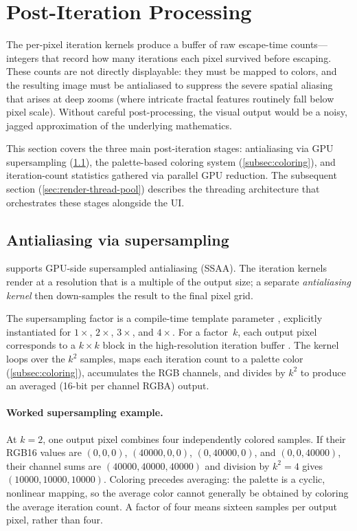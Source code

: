 \section{Post-Iteration Processing}
\label{sec:misc-details}

The per-pixel iteration kernels produce a buffer of raw escape-time
counts---integers that record how many iterations each pixel survived
before escaping.  These counts are not directly displayable: they must
be mapped to colors, and the resulting image must be antialiased to
suppress the severe spatial aliasing that arises at deep zooms (where
intricate fractal features routinely fall below pixel scale).  Without
careful post-processing, the visual output would be a noisy, jagged
approximation of the underlying mathematics.

This section covers the three main post-iteration stages:
antialiasing via GPU supersampling (\cref{subsec:antialiasing}), the
palette-based coloring system (\cref{subsec:coloring}), and
iteration-count statistics gathered via parallel GPU reduction.  The
subsequent section (\cref{sec:render-thread-pool}) describes the
threading architecture that orchestrates these stages alongside the UI.

\subsection{Antialiasing via supersampling}
\label{subsec:antialiasing}

\FractalShark{} supports GPU-side supersampled antialiasing (SSAA).
The iteration kernels render at a resolution that is a multiple of
the output size; a separate \emph{antialiasing kernel} then
down-samples the result to the final pixel grid.

The supersampling factor is a compile-time template parameter
, explicitly instantiated for $1\times$, $2\times$,
$3\times$, and $4\times$.  For a factor~$k$, each output pixel
corresponds to a $k\times k$ block in the high-resolution iteration
buffer .  The kernel loops over the $k^2$
samples, maps each iteration count to a palette color
(\cref{subsec:coloring}), accumulates the RGB channels, and divides
by $k^2$ to produce an averaged  (16-bit per channel
RGBA) output.

\paragraph{Worked supersampling example.}
At $k=2$, one output pixel combines four independently colored samples. If their
RGB16 values are $(0,0,0)$, $(40000,0,0)$, $(0,40000,0)$, and $(0,0,40000)$,
their channel sums are $(40000,40000,40000)$ and division by $k^2=4$ gives
$(10000,10000,10000)$. Coloring precedes averaging: the palette is a cyclic,
nonlinear mapping, so the average color cannot generally be obtained by coloring
the average iteration count. A factor of four means sixteen samples per output
pixel, rather than four.

